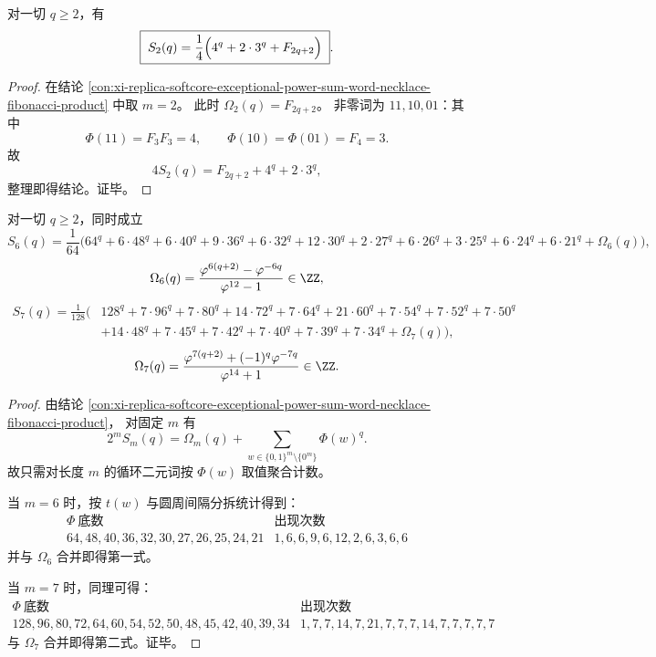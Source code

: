 \begin{corollary}[例外谱二次幂和的闭式]\label{cor:xi-replica-softcore-exceptional-power-sum-square-closed-form-via-fib-necklace}
对一切 \(q\ge 2\)，有
\[
\boxed{\;
S_2(q)=\frac14\Bigl(4^q+2\cdot 3^q+F_{2q+2}\Bigr)\; }.
\]
\end{corollary}
\begin{proof}
在结论 \ref{con:xi-replica-softcore-exceptional-power-sum-word-necklace-fibonacci-product} 中取 \(m=2\)。
此时 \(\Omega_2(q)=F_{2q+2}\)。
非零词为 \(11,10,01\)：其中
\[
\Phi(11)=F_3F_3=4,\qquad
\Phi(10)=\Phi(01)=F_4=3.
\]
故
\[
4S_2(q)=F_{2q+2}+4^q+2\cdot 3^q,
\]
整理即得结论。证毕。
\end{proof}

\begin{conclusion}[六阶与七阶例外幂和的完全指数分解]\label{con:xi-replica-softcore-exceptional-power-sum-m6m7-full-exponential-decomposition}
对一切 \(q\ge 2\)，同时成立
\[
\boxed{
S_6(q)=\frac1{64}\Big(
64^q+6\cdot48^q+6\cdot40^q+9\cdot36^q+6\cdot32^q+12\cdot30^q+2\cdot27^q
+6\cdot26^q+3\cdot25^q+6\cdot24^q+6\cdot21^q+\Omega_6(q)
\Big)},
\]
\[
\Omega_6(q)=\frac{\varphi^{6(q+2)}-\varphi^{-6q}}{\varphi^{12}-1}\in\ZZ,
\]
\[
\boxed{
\begin{aligned}
S_7(q)=\frac1{128}\Big(&
128^q+7\cdot96^q+7\cdot80^q+14\cdot72^q+7\cdot64^q+21\cdot60^q
+7\cdot54^q+7\cdot52^q+7\cdot50^q\\
&+14\cdot48^q+7\cdot45^q+7\cdot42^q+7\cdot40^q+7\cdot39^q+7\cdot34^q
+\Omega_7(q)\Big),
\end{aligned}}
\]
\[
\Omega_7(q)=\frac{\varphi^{7(q+2)}+(-1)^q\varphi^{-7q}}{\varphi^{14}+1}\in\ZZ.
\]
\end{conclusion}
\begin{proof}
由结论 \ref{con:xi-replica-softcore-exceptional-power-sum-word-necklace-fibonacci-product}，
对固定 \(m\) 有
\[
2^mS_m(q)=\Omega_m(q)+\sum_{w\in\{0,1\}^m\setminus\{0^m\}}\Phi(w)^q.
\]
故只需对长度 \(m\) 的循环二元词按 \(\Phi(w)\) 取值聚合计数。

当 \(m=6\) 时，按 \(t(w)\) 与圆周间隔分拆统计得到：
\[
\begin{array}{c|c}
\Phi\ \text{底数} & \text{出现次数}\\\hline
64,48,40,36,32,30,27,26,25,24,21
&1,6,6,9,6,12,2,6,3,6,6
\end{array}
\]
并与 \(\Omega_6\) 合并即得第一式。

当 \(m=7\) 时，同理可得：
\[
\begin{array}{c|c}
\Phi\ \text{底数} & \text{出现次数}\\\hline
128,96,80,72,64,60,54,52,50,48,45,42,40,39,34
&1,7,7,14,7,21,7,7,7,14,7,7,7,7,7
\end{array}
\]
与 \(\Omega_7\) 合并即得第二式。证毕。
\end{proof}

